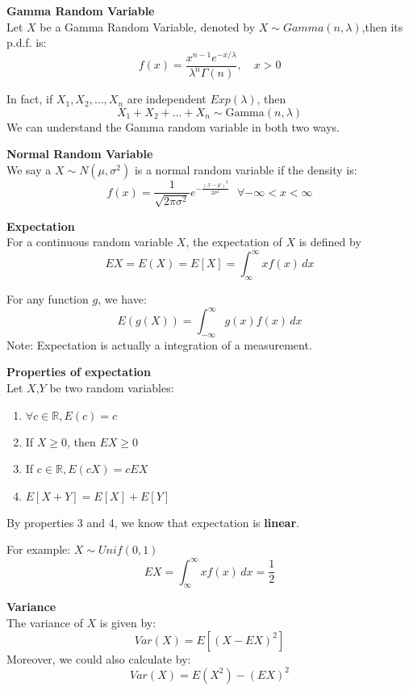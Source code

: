 \documentclass{article}
\begin{document}
\begin{definition}
    \textbf{Gamma Random Variable}\\
    Let $X$ be a Gamma Random Variable, denoted by $X \sim Gamma(n,\lambda)$,then its p.d.f. is:
    $$ f(x) = \frac{x^{n-1} e^{-x/\lambda}}{\lambda^n \Gamma(n)}, \quad x > 0$$
\end{definition}
In fact, if $X_1, X_2, \dots ,X_n$ are independent $Exp(\lambda)$, then
$$ X_1 + X_2 + \dots + X_n \sim \text{Gamma}(n, \lambda)$$
We can understand the Gamma random variable in both two ways.
\begin{definition}
    \textbf{Normal Random Variable}\\
    We say a $X \sim N(\mu, \sigma^2)$ is a normal random variable if the density is:
    $$ f(x) = \frac{1}{\sqrt{2\pi\sigma^2}}e^{-\frac{(x-\mu)^2}{2\sigma^2}} \textbf{ } \forall -\infty < x < \infty$$
\end{definition}

\begin{definition}
    \textbf{Expectation}\\
    For a continuous random variable $X$, the expectation of $X$ is defined by
    $$EX = E(X) = E[X] = \int^{\infty}_{\infty} xf(x) \, dx$$
\end{definition}
For any function $g$, we have:
$$ E(g(X)) = \int^{\infty}_{-\infty} g(x)f(x) \, dx$$
Note: Expectation is actually a integration of a measurement.

\begin{theorem}
    \textbf{Properties of expectation}\\
    Let $X$,$Y$ be two random variables:
    \begin{enumerate}
        \item $\forall c \in \mathbb{R}, E(c) = c$
        \item If $X \geq 0$, then $EX \geq 0$
        \item If $c \in \mathbb{R}, E(cX) = cEX$
        \item $E[X+Y] = E[X] + E[Y]$
    \end{enumerate}
    By properties 3 and 4, we know that expectation is \textbf{linear}.
\end{theorem}
For example: $X \sim Unif(0,1)$
$$ EX = \int^{\infty}_{\infty} xf(x) \, dx = \frac{1}{2}$$
\begin{definition}
    \textbf{Variance}\\
    The variance of $X$ is given by:
    $$ Var(X) = E[(X - EX)^2]$$
    Moreover, we could also calculate by:
    $$ Var(X) = E(X^2) - (EX)^2$$
\end{definition}
\end{document}
